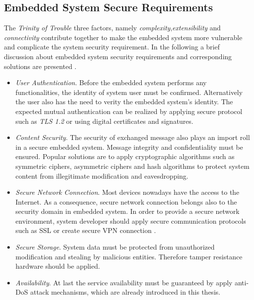 \subsection{Embedded System Secure Requirements}
The \emph{Trinity of Trouble} \cite{embedded_secure} three factors, namely \emph{complexity},\emph{extensibility} and \emph{connectivity} contribute together to make the embedded system more vulnerable and complicate the system security requirement.
In the following a brief discussion about embedded system security requirements and corresponding solutions are presented \cite{embedded_secure}.
\begin{itemize}
\item \emph{User Authentication}. Before the embedded system performs any functionalities, the identity of system user must be confirmed. Alternatively the user also has the need to verity the embedded system's identity. The expected mutual authentication can be realized by applying secure protocol such as \emph{TLS 1.2} or using digital certificates and signatures.
\item \emph{Content Security}. The security of exchanged message also plays an import roll in a secure embedded system. Message integrity and confidentiality must be ensured. Popular solutions are to apply cryptographic algorithms such as symmetric ciphers, asymmetric ciphers and hash algorithms to protect system content from illegitimate modification and eavesdropping.
\item \emph{Secure Network Connection}. Most devices nowadays have the access to the Internet. As a consequence, secure  network connection belongs also to the security domain in embedded system. In order  to provide a secure network environment, system developer should apply secure communication protocols such as SSL or create secure VPN connection \cite{embedded_secure}.
\item \emph{Secure Storage}. System data must be protected from unauthorized modification and stealing by malicious entities. Therefore tamper resistance hardware should be applied.
\item \emph{Availability}. At last the service availability must be guaranteed by apply anti-DoS attack mechanisms, which are already introduced in this thesis.
\end{itemize}
